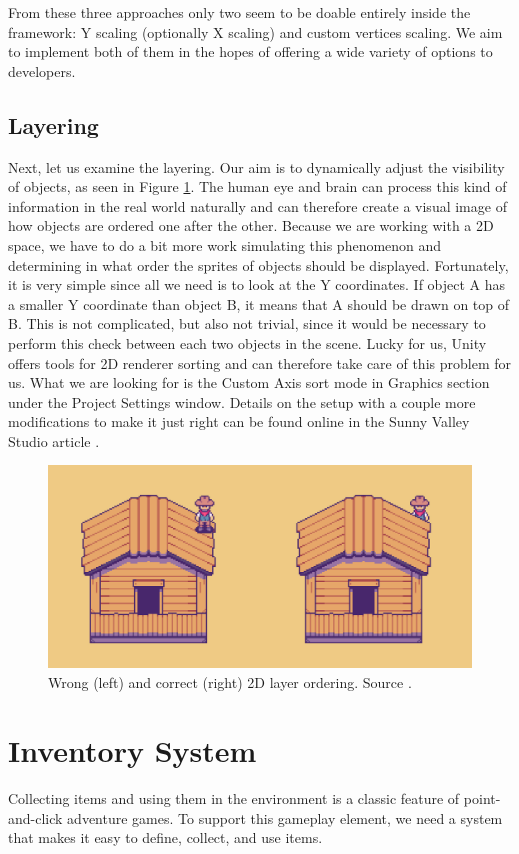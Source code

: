 From these three approaches only two seem to be doable entirely inside the framework: Y scaling (optionally X scaling) and custom vertices scaling. We aim to implement both of them in the hopes of offering a wide variety of options to developers.

\subsection{Layering}
Next, let us examine the layering. Our aim is to dynamically adjust the visibility of objects, as seen in Figure \ref{fig:Layers}. The human eye and brain can process this kind of information in the real world naturally and can therefore create a visual image of how objects are ordered one after the other. Because we are working with a 2D space, we have to do a bit more work simulating this phenomenon and determining in what order the sprites of objects should be displayed. Fortunately, it is very simple since all we need is to look at the Y coordinates. If object A has a smaller Y coordinate than object B, it means that A should be drawn on top of B. This is not complicated, but also not trivial, since it would be necessary to perform this check between each two objects in the scene. Lucky for us, Unity offers tools for 2D renderer sorting \cite{Unity-sorting} and can therefore take care of this problem for us. What we are looking for is the Custom Axis sort mode \cite{Unity-customAxis} in Graphics section under the Project Settings window. Details on the setup with a couple more modifications to make it just right can be found online in the Sunny Valley Studio article \cite{Piotr} . 

\begin{figure}[H]
\centering
\includegraphics[width=.8\linewidth]{img/layers.png}
\caption{Wrong (left) and correct (right) 2D layer ordering. Source \cite{Piotr}.}
\label{fig:Layers}
\end{figure}

\section{Inventory System}
Collecting items and using them in the environment is a classic feature of point-and-click adventure games. To support this gameplay element, we need a system that makes it easy to define, collect, and use items. 

